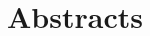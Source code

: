 \newpage
\section{Abstracts}

\begin{multicols}{2}

\end{multicols}
\newpage
\renewcommand{\indexname}{Author Index}
\printindex
